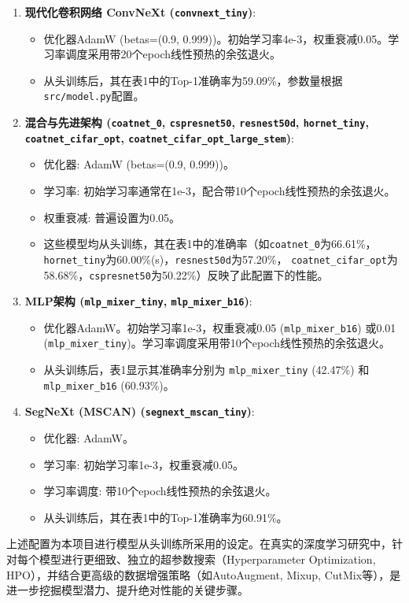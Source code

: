\documentclass[a4paper]{article}
\begin{document}
\begin{enumerate}
    \item \textbf{现代化卷积网络 ConvNeXt (\texttt{convnext\_tiny})}:
    \begin{itemize}
        \item 优化器AdamW (betas=(0.9, 0.999))。初始学习率4e-3，权重衰减0.05。学习率调度采用带20个epoch线性预热的余弦退火。
        \item 从头训练后，其在表1中的Top-1准确率为59.09\%，参数量根据\texttt{src/model.py}配置。
    \end{itemize}
    
    \item \textbf{混合与先进架构 (\texttt{coatnet\_0}, \texttt{cspresnet50}, \texttt{resnest50d}, \texttt{hornet\_tiny}, \texttt{coatnet\_cifar\_opt}, \texttt{coatnet\_cifar\_opt\_large\_stem})}:
    \begin{itemize}
        \item 优化器: AdamW (betas=(0.9, 0.999))。
        \item 学习率: 初始学习率通常在1e-3，配合带10个epoch线性预热的余弦退火。
        \item 权重衰减: 普遍设置为0.05。
        \item 这些模型均从头训练，其在表1中的准确率（如\texttt{coatnet\_0}为66.61\%，\texttt{hornet\_tiny}为60.00\%(s)，\texttt{resnest50d}为57.20\%， \texttt{coatnet\_cifar\_opt}为58.68\%，\texttt{cspresnet50}为50.22\%）反映了此配置下的性能。
    \end{itemize}
    
    \item \textbf{MLP架构 (\texttt{mlp\_mixer\_tiny}, \texttt{mlp\_mixer\_b16})}:
    \begin{itemize}
        \item 优化器AdamW。初始学习率1e-3，权重衰减0.05 (\texttt{mlp\_mixer\_b16}) 或0.01 (\texttt{mlp\_mixer\_tiny})。学习率调度采用带10个epoch线性预热的余弦退火。
        \item 从头训练后，表1显示其准确率分别为 \texttt{mlp\_mixer\_tiny} (42.47\%) 和 \texttt{mlp\_mixer\_b16} (60.93\%)。
    \end{itemize}
    
    \item \textbf{SegNeXt (MSCAN) (\texttt{segnext\_mscan\_tiny})}:
    \begin{itemize}
        \item 优化器: AdamW。
        \item 学习率: 初始学习率1e-3，权重衰减0.05。
        \item 学习率调度: 带10个epoch线性预热的余弦退火。
        \item 从头训练后，其在表1中的Top-1准确率为60.91\%。
    \end{itemize}
\end{enumerate}
上述配置为本项目进行模型从头训练所采用的设定。在真实的深度学习研究中，针对每个模型进行更细致、独立的超参数搜索（Hyperparameter Optimization, HPO），并结合更高级的数据增强策略（如AutoAugment, Mixup, CutMix等），是进一步挖掘模型潜力、提升绝对性能的关键步骤。
\end{document}
